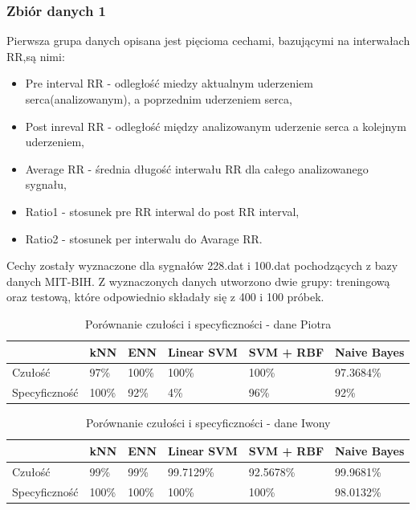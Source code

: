 \documentclass[[10pt,a4paper]{article}
\begin{document}
\subsubsection{Zbiór danych 1}
Pierwsza grupa danych opisana jest pięcioma cechami, bazującymi na interwałach RR,są nimi:
\begin{itemize}
\item Pre interval RR - odległość miedzy aktualnym uderzeniem serca(analizowanym), a poprzednim uderzeniem serca,
\item Post inreval RR  - odległość między analizowanym uderzenie serca a kolejnym uderzeniem,
\item Average RR - średnia długość interwału RR dla całego analizowanego sygnału,
\item Ratio1 - stosunek pre RR interwal do post RR interval,
\item Ratio2 - stosunek per interwalu do Avarage RR.
\end{itemize}

Cechy zostały wyznaczone dla sygnałów 228.dat i 100.dat pochodzących z bazy danych MIT-BIH. Z wyznaczonych danych utworzono dwie grupy: treningową oraz testową, które odpowiednio składały się z 400 i 100 próbek. 


\begin{table}[h]
\centering
\caption{Porównanie czułości i specyficzności - dane Piotra}
\label{sens1}
\begin{tabular}{|l|l|l|l|l|l|}
\hline
              & kNN & ENN & Linear SVM & SVM + RBF & Naive Bayes \\ \hline
Czułość       &  97\%  & 100\%  &    100\%    &    100\%   &      97.3684\%      \\ \hline
Specyficzność &   100\%   &  92\%   &     4\%       &     96\%   &       92\%      \\ \hline
\end{tabular}
\end{table}


\begin{table}[h]
\centering
\caption{Porównanie czułości i specyficzności - dane Iwony}
\label{sens2}
\begin{tabular}{|l|l|l|l|l|l|}
\hline
              & kNN & ENN & Linear SVM & SVM + RBF & Naive Bayes \\ \hline
Czułość       &  99\%   &  99\%   &    99.7129\%        &     92.5678\%       &   99.9681\%          \\ \hline
Specyficzność &  100\%   &  100\%   &     100\%       &      100\%     &   98.0132\%          \\ \hline
\end{tabular}
\end{table}
\end{document}
